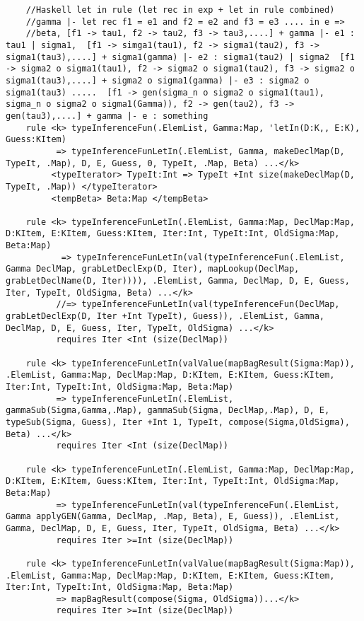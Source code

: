 \begin{lstlisting}
    //Haskell let in rule (let rec in exp + let in rule combined)
    //gamma |- let rec f1 = e1 and f2 = e2 and f3 = e3 .... in e =>
    //beta, [f1 -> tau1, f2 -> tau2, f3 -> tau3,....] + gamma |- e1 : tau1 | sigma1,  [f1 -> simga1(tau1), f2 -> sigma1(tau2), f3 -> sigma1(tau3),....] + sigma1(gamma) |- e2 : sigma1(tau2) | sigma2  [f1 -> sigma2 o sigma1(tau1), f2 -> sigma2 o sigma1(tau2), f3 -> sigma2 o sigma1(tau3),....] + sigma2 o sigma1(gamma) |- e3 : sigma2 o sigma1(tau3) .....  [f1 -> gen(sigma_n o sigma2 o sigma1(tau1), sigma_n o sigma2 o sigma1(Gamma)), f2 -> gen(tau2), f3 -> gen(tau3),....] + gamma |- e : something
    rule <k> typeInferenceFun(.ElemList, Gamma:Map, 'letIn(D:K,, E:K), Guess:KItem)
          => typeInferenceFunLetIn(.ElemList, Gamma, makeDeclMap(D, TypeIt, .Map), D, E, Guess, 0, TypeIt, .Map, Beta) ...</k>
         <typeIterator> TypeIt:Int => TypeIt +Int size(makeDeclMap(D, TypeIt, .Map)) </typeIterator>
         <tempBeta> Beta:Map </tempBeta>

    rule <k> typeInferenceFunLetIn(.ElemList, Gamma:Map, DeclMap:Map, D:KItem, E:KItem, Guess:KItem, Iter:Int, TypeIt:Int, OldSigma:Map, Beta:Map)
           => typeInferenceFunLetIn(val(typeInferenceFun(.ElemList, Gamma DeclMap, grabLetDeclExp(D, Iter), mapLookup(DeclMap, grabLetDeclName(D, Iter)))), .ElemList, Gamma, DeclMap, D, E, Guess, Iter, TypeIt, OldSigma, Beta) ...</k>
          //=> typeInferenceFunLetIn(val(typeInferenceFun(DeclMap, grabLetDeclExp(D, Iter +Int TypeIt), Guess)), .ElemList, Gamma, DeclMap, D, E, Guess, Iter, TypeIt, OldSigma) ...</k>
          requires Iter <Int (size(DeclMap))

    rule <k> typeInferenceFunLetIn(valValue(mapBagResult(Sigma:Map)), .ElemList, Gamma:Map, DeclMap:Map, D:KItem, E:KItem, Guess:KItem, Iter:Int, TypeIt:Int, OldSigma:Map, Beta:Map)
          => typeInferenceFunLetIn(.ElemList, gammaSub(Sigma,Gamma,.Map), gammaSub(Sigma, DeclMap,.Map), D, E, typeSub(Sigma, Guess), Iter +Int 1, TypeIt, compose(Sigma,OldSigma), Beta) ...</k>
          requires Iter <Int (size(DeclMap))

    rule <k> typeInferenceFunLetIn(.ElemList, Gamma:Map, DeclMap:Map, D:KItem, E:KItem, Guess:KItem, Iter:Int, TypeIt:Int, OldSigma:Map, Beta:Map)
          => typeInferenceFunLetIn(val(typeInferenceFun(.ElemList, Gamma applyGEN(Gamma, DeclMap, .Map, Beta), E, Guess)), .ElemList, Gamma, DeclMap, D, E, Guess, Iter, TypeIt, OldSigma, Beta) ...</k>
          requires Iter >=Int (size(DeclMap))

    rule <k> typeInferenceFunLetIn(valValue(mapBagResult(Sigma:Map)), .ElemList, Gamma:Map, DeclMap:Map, D:KItem, E:KItem, Guess:KItem, Iter:Int, TypeIt:Int, OldSigma:Map, Beta:Map)
          => mapBagResult(compose(Sigma, OldSigma))...</k>
          requires Iter >=Int (size(DeclMap))


\end{lstlisting}
